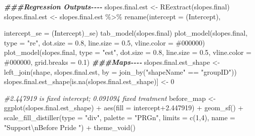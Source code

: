 \documentclass[
]{article}
\newenvironment{Shaded}{\begin{snugshade}}{\end{snugshade}}
\newcommand{\AttributeTok}[1]{\textcolor[rgb]{0.77,0.63,0.00}{#1}}
\newcommand{\CommentTok}[1]{\textcolor[rgb]{0.56,0.35,0.01}{\textit{#1}}}
\newcommand{\DecValTok}[1]{\textcolor[rgb]{0.00,0.00,0.81}{#1}}
\newcommand{\DocumentationTok}[1]{\textcolor[rgb]{0.56,0.35,0.01}{\textbf{\textit{#1}}}}
\newcommand{\FloatTok}[1]{\textcolor[rgb]{0.00,0.00,0.81}{#1}}
\newcommand{\FunctionTok}[1]{\textcolor[rgb]{0.00,0.00,0.00}{#1}}
\newcommand{\NormalTok}[1]{#1}
\newcommand{\OtherTok}[1]{\textcolor[rgb]{0.56,0.35,0.01}{#1}}
\newcommand{\SpecialCharTok}[1]{\textcolor[rgb]{0.00,0.00,0.00}{#1}}
\newcommand{\StringTok}[1]{\textcolor[rgb]{0.31,0.60,0.02}{#1}}
\begin{document}
\begin{Shaded}
\begin{Highlighting}[]
\DocumentationTok{\#\#\#Regression Outputs{-}{-}{-}{-}}
\NormalTok{slopes.final.est }\OtherTok{\textless{}{-}} \FunctionTok{REextract}\NormalTok{(slopes.final)}
\NormalTok{slopes.final.est }\OtherTok{\textless{}{-}}\NormalTok{ slopes.final.est }\SpecialCharTok{\%\textgreater{}\%} \FunctionTok{rename}\NormalTok{(}\AttributeTok{intercept =} \StringTok{\textasciigrave{}}\AttributeTok{(Intercept)}\StringTok{\textasciigrave{}}\NormalTok{,}
                         
                                                                       \AttributeTok{intercept\_se =} \StringTok{\textasciigrave{}}\AttributeTok{(Intercept)\_se}\StringTok{\textasciigrave{}}\NormalTok{)}
\FunctionTok{tab\_model}\NormalTok{(slopes.final)}
\FunctionTok{plot\_model}\NormalTok{(slopes.final, }\AttributeTok{type =} \StringTok{"re"}\NormalTok{, }\AttributeTok{dot.size =} \FloatTok{0.8}\NormalTok{, }\AttributeTok{line.size =} \FloatTok{0.5}\NormalTok{, }\AttributeTok{vline.color =} \StringTok{\textquotesingle{}\#000000\textquotesingle{}}\NormalTok{)}
\FunctionTok{plot\_model}\NormalTok{(slopes.final, }\AttributeTok{type =} \StringTok{"est"}\NormalTok{, }\AttributeTok{dot.size =} \FloatTok{0.8}\NormalTok{, }\AttributeTok{line.size =} \FloatTok{0.5}\NormalTok{, }\AttributeTok{vline.color =} \StringTok{\textquotesingle{}\#000000\textquotesingle{}}\NormalTok{, }\AttributeTok{grid.breaks =} \FloatTok{0.1}\NormalTok{)}
\DocumentationTok{\#\#\#Maps{-}{-}{-}{-}}
\NormalTok{slopes.final.est\_shape }\OtherTok{\textless{}{-}} \FunctionTok{left\_join}\NormalTok{(shape, slopes.final.est, }\AttributeTok{by =} \FunctionTok{join\_by}\NormalTok{(}\StringTok{"shapeName"} \SpecialCharTok{==} \StringTok{"groupID"}\NormalTok{))}
\NormalTok{slopes.final.est\_shape[}\FunctionTok{is.na}\NormalTok{(slopes.final.est\_shape)] }\OtherTok{\textless{}{-}} \DecValTok{0}


\CommentTok{\#2.447919 is fixed intercept; 0.091094 fixed treatment}
\NormalTok{before\_map }\OtherTok{\textless{}{-}} \FunctionTok{ggplot}\NormalTok{(slopes.final.est\_shape) }\SpecialCharTok{+}
  \FunctionTok{aes}\NormalTok{(}\AttributeTok{fill =}\NormalTok{ intercept}\FloatTok{+2.447919}\NormalTok{) }\SpecialCharTok{+}
  \FunctionTok{geom\_sf}\NormalTok{() }\SpecialCharTok{+} 
  \FunctionTok{scale\_fill\_distiller}\NormalTok{(}\AttributeTok{type =} \StringTok{"div"}\NormalTok{, }\AttributeTok{palette =} \StringTok{"PRGn"}\NormalTok{, }\AttributeTok{limits =} \FunctionTok{c}\NormalTok{(}\DecValTok{1}\NormalTok{,}\DecValTok{4}\NormalTok{), }\AttributeTok{name =} \StringTok{"Support}\SpecialCharTok{\textbackslash{}n}\StringTok{Before Pride "}\NormalTok{) }\SpecialCharTok{+}
  \FunctionTok{theme\_void}\NormalTok{()}


\end{Highlighting}
\end{Shaded}
\end{document}

